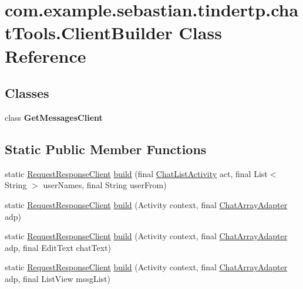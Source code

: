 \hypertarget{classcom_1_1example_1_1sebastian_1_1tindertp_1_1chatTools_1_1ClientBuilder}{}\section{com.\+example.\+sebastian.\+tindertp.\+chat\+Tools.\+Client\+Builder Class Reference}
\label{classcom_1_1example_1_1sebastian_1_1tindertp_1_1chatTools_1_1ClientBuilder}
\subsection*{Classes}
\begin{DoxyCompactItemize}
\item 
class {\bfseries Get\+Messages\+Client}
\end{DoxyCompactItemize}
\subsection*{Static Public Member Functions}
\begin{DoxyCompactItemize}
\item 
static \hyperlink{classcom_1_1example_1_1sebastian_1_1tindertp_1_1internetTools_1_1RequestResponseClient}{Request\+Response\+Client} \hyperlink{classcom_1_1example_1_1sebastian_1_1tindertp_1_1chatTools_1_1ClientBuilder_a63a1adda7ac262c72a9439884529bd8e}{build} (final \hyperlink{classcom_1_1example_1_1sebastian_1_1tindertp_1_1ChatListActivity}{Chat\+List\+Activity} act, final List$<$ String $>$ user\+Names, final String user\+From)
\item 
static \hyperlink{classcom_1_1example_1_1sebastian_1_1tindertp_1_1internetTools_1_1RequestResponseClient}{Request\+Response\+Client} \hyperlink{classcom_1_1example_1_1sebastian_1_1tindertp_1_1chatTools_1_1ClientBuilder_a833b26ff17816ebe203bfcb62f80c577}{build} (Activity context, final \hyperlink{classcom_1_1example_1_1sebastian_1_1tindertp_1_1chatTools_1_1ChatArrayAdapter}{Chat\+Array\+Adapter} adp)
\item 
static \hyperlink{classcom_1_1example_1_1sebastian_1_1tindertp_1_1internetTools_1_1RequestResponseClient}{Request\+Response\+Client} \hyperlink{classcom_1_1example_1_1sebastian_1_1tindertp_1_1chatTools_1_1ClientBuilder_a8500d455df4ef3a6dbe81bbe99418667}{build} (Activity context, final \hyperlink{classcom_1_1example_1_1sebastian_1_1tindertp_1_1chatTools_1_1ChatArrayAdapter}{Chat\+Array\+Adapter} adp, final Edit\+Text chat\+Text)
\item 
static \hyperlink{classcom_1_1example_1_1sebastian_1_1tindertp_1_1internetTools_1_1RequestResponseClient}{Request\+Response\+Client} \hyperlink{classcom_1_1example_1_1sebastian_1_1tindertp_1_1chatTools_1_1ClientBuilder_aaf8dc904d31c1bf4cfc3a670b5f989bf}{build} (Activity context, final \hyperlink{classcom_1_1example_1_1sebastian_1_1tindertp_1_1chatTools_1_1ChatArrayAdapter}{Chat\+Array\+Adapter} adp, final List\+View mssg\+List)
\end{DoxyCompactItemize}
